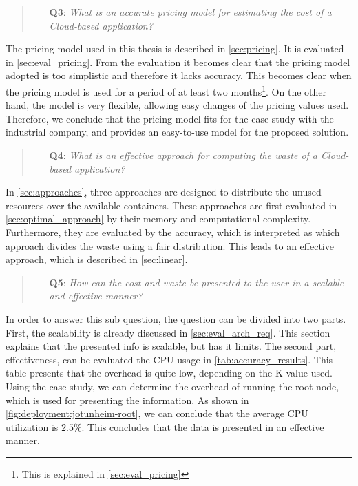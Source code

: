 \begin{quote}
    \begin{itemize}
        \item[\textbf{Q3}: ]\textit{What is an accurate pricing model for estimating the cost of a Cloud-based application?}
    \end{itemize}
\end{quote}
\noindent
The pricing model used in this thesis is described in \autoref{sec:pricing}. It is evaluated in \autoref{sec:eval_pricing}. From the evaluation it becomes clear that the pricing model adopted is too simplistic and therefore it lacks accuracy. This becomes clear when the pricing model is used for a period of at least two months\footnote{This is explained in \autoref{sec:eval_pricing}}. On the other hand, the model is very flexible, allowing easy changes of the pricing values used. Therefore, we conclude that the pricing model fits for the case study with the industrial company, and provides an easy-to-use model for the proposed solution.


\begin{quote}
    \begin{itemize}
        \item[\textbf{Q4}: ]\textit{What is an effective approach for computing the waste of a Cloud-based application?}
    \end{itemize}
\end{quote}
\noindent
In \autoref{sec:approaches}, three approaches are designed to distribute the unused resources over the available containers. These approaches are first evaluated in \autoref{sec:optimal_approach} by their memory and computational complexity. Furthermore, they are evaluated by the accuracy, which is interpreted as which approach divides the waste using a fair distribution. This leads to an effective approach, which is described in \autoref{sec:linear}.

\begin{quote}
    \begin{itemize}
        \item[\textbf{Q5}: ]\textit{How can the cost and waste be presented to the user in a scalable and effective manner?}
    \end{itemize}
\end{quote}
\noindent
In order to answer this sub question, the question can be divided into two parts. First, the scalability is already discussed in \autoref{sec:eval_arch_req}. This section explains that the presented info is scalable, but has it limits. The second part, effectiveness, can be evaluated the CPU usage in \autoref{tab:accuracy_results}. This table presents that the overhead is quite low, depending on the K-value used. Using the case study, we can determine the overhead of running the root node, which is used for presenting the information. As shown in \autoref{fig:deployment:jotunheim-root}, we can conclude that the average CPU utilization is $2.5\%$. This concludes that the data is presented in an effective manner. 

